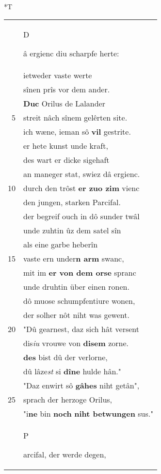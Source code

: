 \documentclass[8pt,a4paper,notitlepage]{article}
\begin{document}
\begin{table}[ht]
\begin{minipage}[t]{0.5\linewidth}
\end{minipage}
\hspace{0.5cm}
\begin{minipage}[t]{0.5\linewidth}
\small
\begin{center}*T
\end{center}
\begin{tabular}{rl}
 & \begin{large}D\end{large}â ergienc diu scharpfe herte:\\ 
 & ietweder vaste werte\\ 
 & sînen prîs vor dem ander.\\ 
 & \textbf{Duc} Orilus de Lalander\\ 
5 & streit nâch sînem gelêrten site.\\ 
 & ich wæne, ieman sô \textbf{vil} gestrite.\\ 
 & er hete kunst unde kraft,\\ 
 & des wart er dicke sigehaft\\ 
 & an maneger stat, swiez dâ ergienc.\\ 
10 & durch den trôst \textbf{er zuo zim} vienc\\ 
 & den jungen, starken Parcifal.\\ 
 & der begreif ouch in dô sunder twâl\\ 
 & unde zuhtin ûz dem satel sîn\\ 
 & als eine garbe heberîn\\ 
15 & vaste ern under\textbf{n arm} swanc,\\ 
 & mit im \textbf{er von dem orse} spranc\\ 
 & unde druhtin über einen ronen.\\ 
 & dô muose schumpfentiure wonen,\\ 
 & der solher nôt niht was gewent.\\ 
20 & "Dû gearnest, daz sich hât versent\\ 
 & dis\textit{iu} vrouwe von \textbf{disem} zorne.\\ 
 & \textbf{des} bist dû der verlorne,\\ 
 & dû lâze\textit{st} si \textbf{dîne} hulde hân."\\ 
 & "Daz enwirt sô \textbf{gâhes} niht getân",\\ 
25 & sprach der herzoge Orilus,\\ 
 & "i\textbf{ne} bin \textbf{noch} \textbf{niht betwungen} sus."\\ 
 & \begin{large}P\end{large}arcifal, der werde degen,\\ 

\end{tabular}
\end{minipage}
\end{table}
\end{document}
